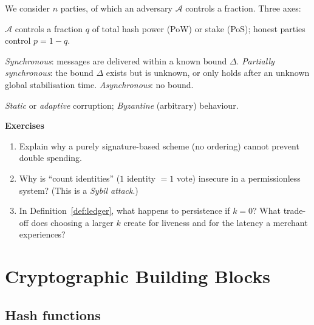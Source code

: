 \documentclass[11pt,a4paper]{article}
\newenvironment{formal}{\par\smallskip}{\par\smallskip}
\newenvironment{exercisebox}{\par\medskip\noindent\textbf{Exercises}\par\nopagebreak\smallskip}{\par\medskip}
\theoremstyle{definition}
\theoremstyle{plain}
\theoremstyle{remark}
\newcommand{\Adv}{\mathcal{A}}
\begin{document}
\begin{formal}
We consider $n$ parties, of which an adversary $\Adv$ controls a fraction. Three axes:
\begin{description}[leftmargin=!,labelwidth=3.5cm]
\item[Resource.] $\Adv$ controls a fraction $q$ of total hash power (PoW) or stake (PoS); honest parties
control $p=1-q$.
\item[Network.] \emph{Synchronous}: messages are delivered within a known bound $\Delta$.
\emph{Partially synchronous}: the bound $\Delta$ exists but is unknown, or only holds after an unknown
global stabilisation time. \emph{Asynchronous}: no bound.
\item[Corruption.] \emph{Static} or \emph{adaptive} corruption; \emph{Byzantine} (arbitrary) behaviour.
\end{description}
\end{formal}

\begin{exercisebox}
\begin{enumerate}[nosep]
\item Explain why a purely signature-based scheme (no ordering) cannot prevent double spending.
\item Why is ``count identities'' ($1$ identity $=1$ vote) insecure in a permissionless system?
(This is a \emph{Sybil attack}.)
\item In Definition~\ref{def:ledger}, what happens to persistence if $k=0$? What trade-off does choosing a larger $k$ create for liveness and for the latency a merchant experiences?
\end{enumerate}
\end{exercisebox}
\section{Cryptographic Building Blocks}\label{sec:crypto}

\subsection{Hash functions}
\end{document}
